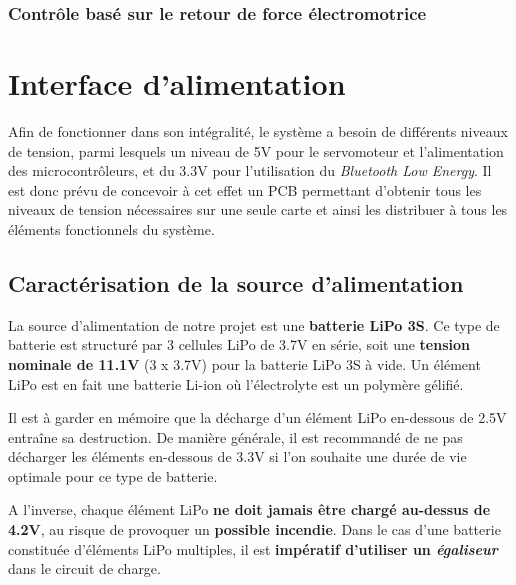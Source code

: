 \documentclass[a4paper,12pt]{report}
\begin{document}
				 
				 
				 
				 
				 
				 
				 
				 

			
			\subsection{Contrôle basé sur le retour de force électromotrice}
	
		\chapter{Interface d'alimentation}
		
		Afin de fonctionner dans son intégralité, le système a besoin de différents niveaux de tension, parmi lesquels un niveau de 5V pour le servomoteur et l'alimentation des microcontrôleurs, et du 3.3V pour l'utilisation du \textit{Bluetooth Low Energy}. Il est donc prévu de concevoir à cet effet un PCB permettant d'obtenir tous les niveaux de tension nécessaires sur une seule carte et ainsi les distribuer à tous les éléments fonctionnels du système.
		
			\section{Caractérisation de la source d'alimentation}
			
			La source d'alimentation de notre projet est une \textbf{batterie LiPo 3S}. Ce type de batterie est structuré par 3 cellules LiPo de 3.7V en série, soit une \textbf{tension nominale de 11.1V} (3 x 3.7V) pour la batterie LiPo 3S à vide. Un élément LiPo est en fait une batterie Li-ion où l'électrolyte est un polymère gélifié.
			
			Il est à garder en mémoire que la décharge d'un élément LiPo en-dessous de 2.5V entraîne sa destruction. De manière générale, il est recommandé de ne pas décharger les éléments en-dessous de 3.3V si l'on souhaite une durée de vie optimale pour ce type de batterie. 
			
		A l'inverse, chaque élément LiPo \textbf{ne doit jamais être chargé au-dessus de 4.2V}, au risque de provoquer un \textbf{possible incendie}. Dans le cas d'une batterie constituée d'éléments LiPo multiples, il est \textbf{impératif d'utiliser un \textit{égaliseur}} dans le circuit de charge.
		
			
\end{document}

